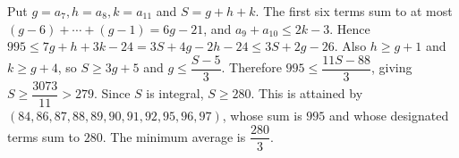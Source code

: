 Put $g=a_7,h=a_8,k=a_{11}$ and $S=g+h+k$. The first six terms sum to at most $(g-6)+\cdots+(g-1)=6g-21$, and $a_9+a_{10}\le2k-3$. Hence $995\le7g+h+3k-24=3S+4g-2h-24\le3S+2g-26$. Also $h\ge g+1$ and $k\ge g+4$, so $S\ge3g+5$ and $g\le\dfrac{S-5}{3}$. Therefore $995\le\dfrac{11S-88}{3}$, giving $S\ge\dfrac{3073}{11}>279$. Since $S$ is integral, $S\ge280$. This is attained by $(84,86,87,88,89,90,91,92,95,96,97)$, whose sum is $995$ and whose designated terms sum to $280$. The minimum average is $\boxed{\dfrac{280}{3}}$.
